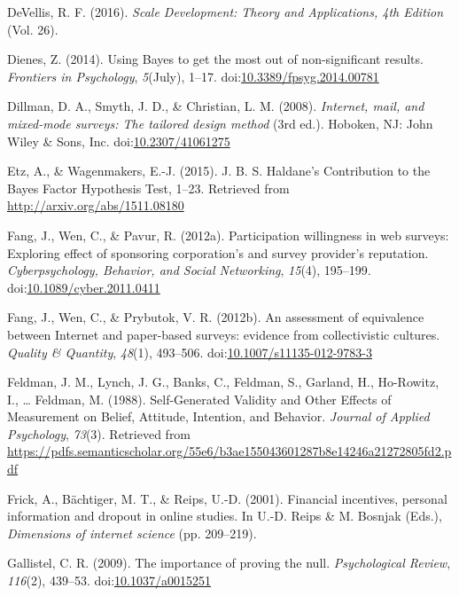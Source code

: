 \documentclass[english,man, mask]{apa6}
\theoremstyle{definition}
\theoremstyle{definition}
\theoremstyle{definition}
\theoremstyle{remark}
\begin{document}
\hypertarget{ref-DeVellis2016a}{}
DeVellis, R. F. (2016). \emph{Scale Development: Theory and
Applications, 4th Edition} (Vol. 26).

\hypertarget{ref-Dienes2014}{}
Dienes, Z. (2014). Using Bayes to get the most out of non-significant
results. \emph{Frontiers in Psychology}, \emph{5}(July), 1--17.
doi:\href{https://doi.org/10.3389/fpsyg.2014.00781}{10.3389/fpsyg.2014.00781}

\hypertarget{ref-Dillman2008}{}
Dillman, D. A., Smyth, J. D., \& Christian, L. M. (2008).
\emph{Internet, mail, and mixed-mode surveys: The tailored design
method} (3rd ed.). Hoboken, NJ: John Wiley \& Sons, Inc.
doi:\href{https://doi.org/10.2307/41061275}{10.2307/41061275}

\hypertarget{ref-Etz2015}{}
Etz, A., \& Wagenmakers, E.-J. (2015). J. B. S. Haldane's Contribution
to the Bayes Factor Hypothesis Test, 1--23. Retrieved from
\url{http://arxiv.org/abs/1511.08180}

\hypertarget{ref-Fang2012a}{}
Fang, J., Wen, C., \& Pavur, R. (2012a). Participation willingness in
web surveys: Exploring effect of sponsoring corporation's and survey
provider's reputation. \emph{Cyberpsychology, Behavior, and Social
Networking}, \emph{15}(4), 195--199.
doi:\href{https://doi.org/10.1089/cyber.2011.0411}{10.1089/cyber.2011.0411}

\hypertarget{ref-Fang2012}{}
Fang, J., Wen, C., \& Prybutok, V. R. (2012b). An assessment of
equivalence between Internet and paper-based surveys: evidence from
collectivistic cultures. \emph{Quality \& Quantity}, \emph{48}(1),
493--506.
doi:\href{https://doi.org/10.1007/s11135-012-9783-3}{10.1007/s11135-012-9783-3}

\hypertarget{ref-Feldman1988}{}
Feldman, J. M., Lynch, J. G., Banks, C., Feldman, S., Garland, H.,
Ho-Rowitz, I., \ldots{} Feldman, M. (1988). Self-Generated Validity and
Other Effects of Measurement on Belief, Attitude, Intention, and
Behavior. \emph{Journal of Applied Psychology}, \emph{73}(3). Retrieved
from
\url{https://pdfs.semanticscholar.org/55e6/b3ae155043601287b8e14246a21272805fd2.pdf}

\hypertarget{ref-Frick2001}{}
Frick, A., Bächtiger, M. T., \& Reips, U.-D. (2001). Financial
incentives, personal information and dropout in online studies. In U.-D.
Reips \& M. Bosnjak (Eds.), \emph{Dimensions of internet science} (pp.
209--219).

\hypertarget{ref-Gallistel2009}{}
Gallistel, C. R. (2009). The importance of proving the null.
\emph{Psychological Review}, \emph{116}(2), 439--53.
doi:\href{https://doi.org/10.1037/a0015251}{10.1037/a0015251}
\end{document}
